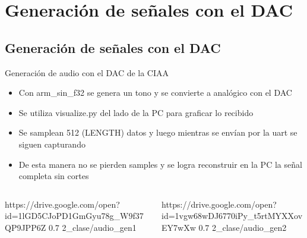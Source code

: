  \section{Generación de señales con el DAC}
 \subsection{Generación de señales con el DAC}
 \begin{frame}[t]{Generación de audio con el DAC de la CIAA}{}
    \protoboardicon
    \footnotesize
    \begin{itemize}
       \item{Con arm\_sin\_f32 se genera un tono y se convierte a analógico con el DAC}
       \item{Se utiliza visualize.py del lado de la PC para graficar lo recibido}
       \item{Se samplean 512 (LENGTH) datos y luego mientras se envían por la uart se siguen capturando}
       \item{De esta manera no se pierden samples y se logra reconstruir en la PC la señal completa sin cortes}
    \end{itemize}

    \begin{columns}[t]
       \hspace{2pt}
       \begin{column}[c]{.5\textwidth}
          {https://drive.google.com/open?id=1lGD5CJoPD1GmGyu78g_W9f37QP9JPP6Z}
          {0.7}
          {2_clase/audio_gen1}
       \end{column}
       \hspace{2pt}
       \vrule
       \hspace{2pt}
       \begin{column}[c]{.5\textwidth}
          {https://drive.google.com/open?id=1vgw68wDJ6770iPy_t5rtMYXXovEY7wXw}
          {0.7}
          {2_clase/audio_gen2}
       \end{column}
       \hspace{2pt}
    \end{columns}
    \vfill
 \end{frame}
